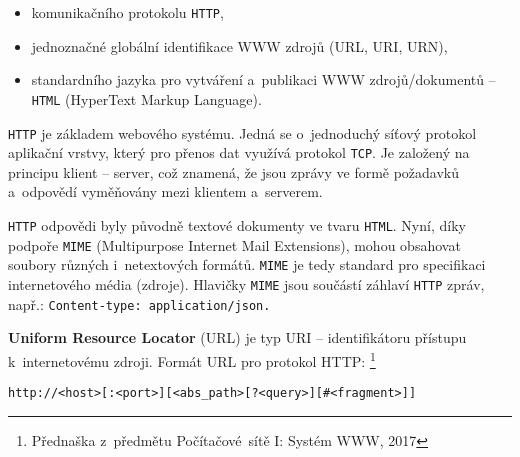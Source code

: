 \documentclass[twoside, 12pt]{article}
\begin{document}
\begin{itemize}
\item komunikačního protokolu \texttt{HTTP},
\item jednoznačné globální identifikace WWW zdrojů (URL, URI, URN),
\item standardního jazyka pro vytváření a~publikaci WWW zdrojů/dokumentů -- \texttt{HTML}
(HyperText Markup Language).
\end{itemize}

\obrazek
{}

\texttt{HTTP} je základem webového systému.
Jedná se o~jednoduchý síťový protokol aplikační vrstvy,
který pro přenos dat využívá protokol \texttt{TCP}.
Je založený na principu klient -- server,
což znamená, že jsou zprávy ve formě požadavků a~odpovědí vyměňovány mezi klientem
a~serverem.

\texttt{HTTP} odpovědi byly původně textové dokumenty ve tvaru \texttt{HTML}.
Nyní, díky podpoře \texttt{MIME} (Multipurpose Internet Mail Extensions),
mohou obsahovat soubory různých i~netextových formátů.
\texttt{MIME} je tedy standard pro specifikaci internetového média (zdroje).
Hlavičky \texttt{MIME} jsou součástí záhlaví \texttt{HTTP} zpráv, např.: \texttt{Content-type:~application/json.}

\textbf{Uniform Resource Locator} (URL) je typ URI -- identifikátoru přístupu k~internetovému zdroji.
Formát URL pro protokol HTTP:
\footnote{Přednaška z~předmětu Počítačové~sítě I: Systém WWW, 2017}

\bigskip
\texttt{http://<host>[:<port>][<abs\_path>[?<query>][\#<fragment>]]}

\bigskip
\end{document}
